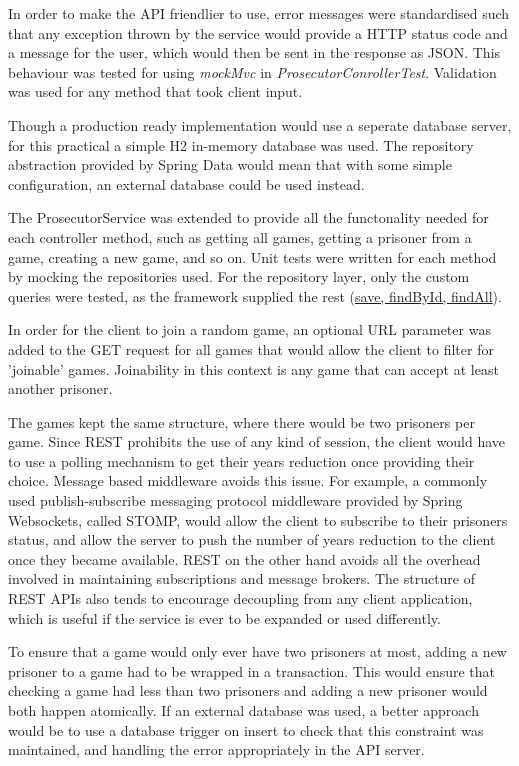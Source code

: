 \documentclass[12pt]{article}
\begin{document}
In order to make the API friendlier to use, error messages were standardised such that any exception thrown by the service would provide a HTTP status code and a message for the user, which would then be sent in the response as JSON. This behaviour was tested for using \emph{mockMvc} in \emph{ProsecutorConrollerTest}. Validation was used for any method that took client input.

Though a production ready implementation would use a seperate database server, for this practical a simple H2 in-memory database was used. The repository abstraction provided by Spring Data would mean that with some simple configuration, an external database could be used instead. 

The ProsecutorService was extended to provide all the functonality needed for each controller method, such as getting all games, getting a prisoner from a game, creating a new game, and so on. Unit tests were written for each method by mocking the repositories used. For the repository layer, only the custom queries were tested, as the framework supplied the rest (\url{save, findById, findAll}). 

In order for the client to join a random game, an optional URL parameter was added to the GET request for all games that would allow the client to filter for 'joinable' games. Joinability in this context is any game that can accept at least another prisoner.

The games kept the same structure, where there would be two prisoners per game. Since REST prohibits the use of any kind of session, the client would have to use a polling mechanism to get their years reduction once providing their choice. Message based middleware avoids this issue. For example, a commonly used publish-subscribe messaging protocol middleware provided by Spring Websockets, called STOMP, would allow the client to subscribe to their prisoners status, and allow the server to push the number of years reduction to the client once they became available. REST on the other hand avoids all the overhead involved in maintaining subscriptions and message brokers. The structure of REST APIs also tends to encourage decoupling from any client application, which is useful if the service is ever to be expanded or used differently.

To ensure that a game would only ever have two prisoners at most, adding a new prisoner to a game had to be wrapped in a transaction. This would ensure that checking a game had less than two prisoners and adding a new prisoner would both happen atomically. If an external database was used, a better approach would be to use a database trigger on insert to check that this constraint was maintained, and handling the error appropriately in the API server. 
\end{document}
